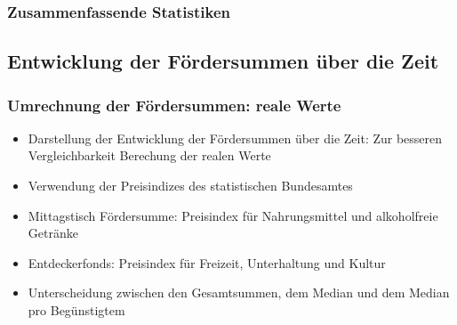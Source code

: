 \begin{frame}[fragile]
\frametitle{Zusammenfassende Statistiken}
\begin{table}[ht]
\centering
{}
\caption{Summary Statistics} 
\label{fundamentalDynamics}
\end{table}

\end{frame}

\subsection{Entwicklung der Fördersummen über die Zeit}

\begin{frame}[fragile]
\frametitle{Umrechnung der Fördersummen: reale Werte}
\begin{itemize}
  \item{Darstellung der Entwicklung der Fördersummen über die Zeit: Zur besseren Vergleichbarkeit Berechung der realen Werte}
  \item{Verwendung der Preisindizes des statistischen Bundesamtes}
  \item{Mittagstisch Fördersumme: Preisindex für Nahrungsmittel und alkoholfreie Getränke}
  \item{Entdeckerfonds: Preisindex für Freizeit, Unterhaltung und Kultur}
  \item{Unterscheidung zwischen den Gesamtsummen, dem Median und dem Median pro Begünstigtem}
\end{itemize}
\end{frame}

